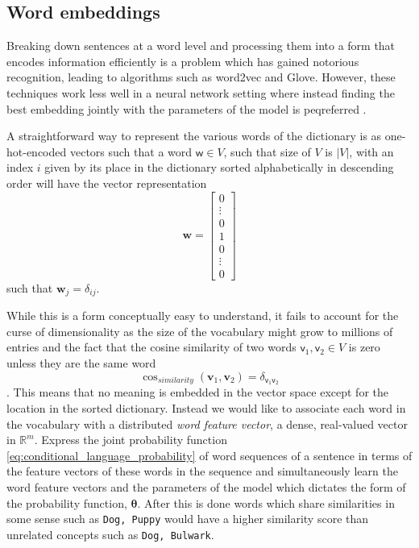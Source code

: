 \subsection{Word embeddings}
Breaking down sentences at a word level and processing them into a form that
encodes information efficiently is a problem which has gained notorious
recognition, leading to algorithms such as word2vec and
Glove\cite{DBLP:journals/corr/abs-1301-3781, Pennington14glove:global,
  Mikolov:2013:DRW:2999792.2999959}. However, these techniques work less well in
a neural network setting where instead finding the best embedding jointly with
the parameters of the model is peqreferred \cite[p.~5-7]{goldberg2015primer}.

A straightforward way to represent the various words of the dictionary is as
one-hot-encoded vectors such that a word $\mathsf{w} \in V$, such that size of
$V$ is $|V|$, with an index $i$ given by its place in the dictionary sorted
alphabetically in descending order will have the vector representation
\begin{equation}
  \label{eq:one_hot_encoding}
  \bm{w} =
  \begin{bmatrix}
    0 \\
    \vdots \\
    0 \\
    1 \\
    0 \\
    \vdots \\
    0
  \end{bmatrix}
\end{equation}\cite[p.~6]{goldberg2015primer}
such that $\bm{w}_{j} = \delta_{ij}$.

While this is a form conceptually easy to understand, it fails to account for the
curse of dimensionality as the size of the vocabulary might grow to millions of
entries and the fact that the cosine similarity of two words $\mathsf{v}_1,
\mathsf{v}_2 \in V$ is zero unless they are the same word
\begin{equation}
  \label{eq:cosine_similarity}
  \cos_{similarity}(\bm{v}_1, \bm{v}_2) = \delta_{\mathsf{v}_1 \mathsf{v}_2}
\end{equation}. This means that no meaning is embedded in the vector space
except for the location in the sorted dictionary. Instead we would like to
associate each word in the vocabulary with a distributed \textit{word feature
  vector}, a dense, real-valued vector in $\mathbb{R}^m$. Express the joint probability
function \eqref{eq:conditional_language_probability} of word sequences of a
sentence in terms of the feature vectors of these words in the sequence and
simultaneously learn the word feature vectors and the parameters of the model
which dictates the form of the probability function, $\bm{\theta}$. After this
is done words which share similarities in some sense such as \texttt{Dog, Puppy}
would have a higher similarity score than unrelated concepts such as \texttt{Dog, Bulwark}\cite{Bengio:2003:NPL:944919.944966}.

